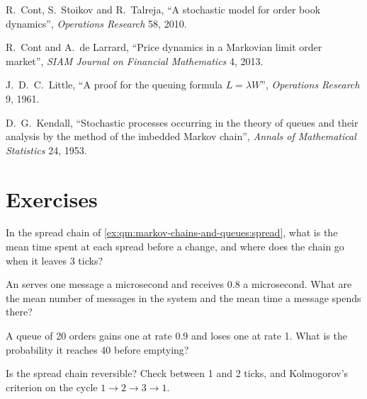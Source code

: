 \begin{omsources}
\item R.~Cont, S.~Stoikov and R.~Talreja, ``A stochastic model for order book dynamics'', \emph{Operations
Research} 58, 2010.
\item R.~Cont and A.~de Larrard, ``Price dynamics in a Markovian limit order market'', \emph{SIAM Journal on
Financial Mathematics} 4, 2013.
\item J.~D.~C.~Little, ``A proof for the queuing formula $L = \lambda W$'', \emph{Operations Research} 9, 1961.
\item D.~G.~Kendall, ``Stochastic processes occurring in the theory of queues and their analysis by the method
of the imbedded Markov chain'', \emph{Annals of Mathematical Statistics} 24, 1953.
\end{omsources}

\section{Exercises}

\begin{exercise}[$\star$]\label{exo:qm:markov-chains-and-queues:1}
In the spread chain of \cref{ex:qm:markov-chains-and-queues:spread}, what is the mean time spent at each spread
before a change, and where does the chain go when it leaves 3 ticks?
\end{exercise}

\begin{exercise}[$\star$]\label{exo:qm:markov-chains-and-queues:2}
An  serves one message a microsecond and receives 0.8 a microsecond. What are the mean number of
messages in the system and the mean time a message spends there?
\end{exercise}

\begin{exercise}[$\star$]\label{exo:qm:markov-chains-and-queues:3}
A queue of 20 orders gains one at rate 0.9 and loses one at rate 1. What is the probability it reaches 40 before
emptying?
\end{exercise}

\begin{exercise}[$\star\star$]\label{exo:qm:markov-chains-and-queues:4}
Is the spread chain reversible? Check  between 1 and 2 ticks, and Kolmogorov's criterion on
the cycle $1 \to 2 \to 3 \to 1$.
\end{exercise}

